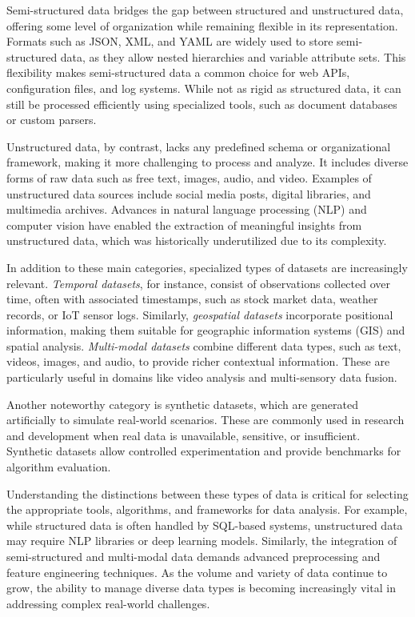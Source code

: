 Semi-structured data bridges the gap between structured and unstructured data, offering some level of organization while remaining flexible in its representation. Formats such as JSON, XML, and YAML are widely used to store semi-structured data, as they allow nested hierarchies and variable attribute sets. This flexibility makes semi-structured data a common choice for web APIs, configuration files, and log systems. While not as rigid as structured data, it can still be processed efficiently using specialized tools, such as document databases or custom parsers.

Unstructured data, by contrast, lacks any predefined schema or organizational framework, making it more challenging to process and analyze. It includes diverse forms of raw data such as free text, images, audio, and video. Examples of unstructured data sources include social media posts, digital libraries, and multimedia archives. Advances in natural language processing (NLP) and computer vision have enabled the extraction of meaningful insights from unstructured data, which was historically underutilized due to its complexity.

In addition to these main categories, specialized types of datasets are increasingly relevant. \textit{Temporal datasets}, for instance, consist of observations collected over time, often with associated timestamps, such as stock market data, weather records, or IoT sensor logs. Similarly, \textit{geospatial datasets} incorporate positional information, making them suitable for geographic information systems (GIS) and spatial analysis. \textit{Multi-modal datasets} combine different data types, such as text, videos, images, and audio, to provide richer contextual information. These are particularly useful in domains like video analysis and multi-sensory data fusion.

Another noteworthy category is synthetic datasets, which are generated artificially to simulate real-world scenarios. These are commonly used in research and development when real data is unavailable, sensitive, or insufficient. Synthetic datasets allow controlled experimentation and provide benchmarks for algorithm evaluation.

Understanding the distinctions between these types of data is critical for selecting the appropriate tools, algorithms, and frameworks for data analysis. For example, while structured data is often handled by SQL-based systems, unstructured data may require NLP libraries or deep learning models. Similarly, the integration of semi-structured and multi-modal data demands advanced preprocessing and feature engineering techniques. As the volume and variety of data continue to grow, the ability to manage diverse data types is becoming increasingly vital in addressing complex real-world challenges.
